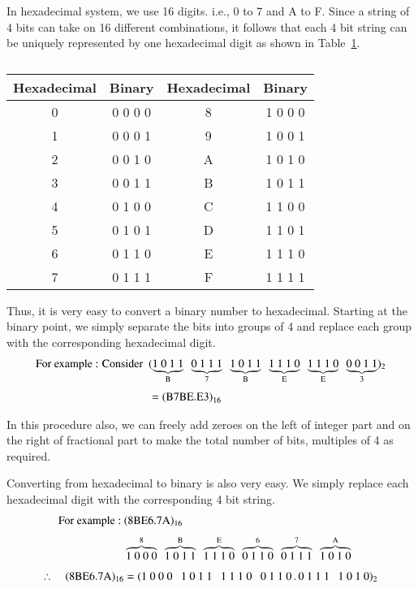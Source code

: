 
In hexadecimal system, we use 16 digits. i.e., 0 to 7 and A to F. Since a string of 4 bits can take on 16 different combinations, it follows that each 4 bit string can be uniquely represented by one hexadecimal digit as shown in Table~\ref{tab5.2}.
\begin{table}[H]
\centering
\caption{}\label{tab5.2}
\renewcommand{\arraystretch}{1.2}
\tabcolsep=10pt
\begin{tabular}{|c|c|c|c|}
\hline
{\bf Hexadecimal} & {\bf Binary} & {\bf Hexadecimal} & {\bf Binary}\\[3pt]
\hline
0 & 0 0 0 0 & 8 & 1 0 0 0\\
1 & 0 0 0 1 & 9 & 1 0 0 1\\
2 & 0 0 1 0 & A & 1 0 1 0\\
3 & 0 0 1 1 & B & 1 0 1 1\\
4 & 0 1 0 0 & C & 1 1 0 0\\
5 & 0 1 0 1 & D & 1 1 0 1\\
6 & 0 1 1 0 & E & 1 1 1 0\\
7 & 0 1 1 1 & F & 1 1 1 1\\
\hline
\end{tabular}
\end{table}

Thus, it is very easy to convert a binary number to hexadecimal. Starting at the binary point, we simply separate the bits into groups of 4 and replace each group with the corresponding hexadecimal digit.
\begin{align*}
\text{For example~: Consider~ } & (\underbrace{1~0~1~1}_{\rmB} \ \ \underbrace{0~1~1~1}_{7} \ \ \underbrace{1~0~1~1}_{\rmB} \ \ \underbrace{1~1~1~0}_{\rmE} \ \ \underbrace{1~1~1~0}_{\rmE} \ \ \underbrace{0~0~1~1}_{3})_{2}\\[3pt]
&= \text{(B7BE.E3)}_{16} 
\end{align*}

In this procedure also, we can freely add zeroes on the left of integer part and on the right of fractional part to make the total number of bits, multiples of 4 as required.

\smallskip
{}

Converting from hexadecimal to binary is also very easy. We simply replace each hexadecimal digit with the corresponding 4 bit string.
\begin{align*}
\text{For example~:~} &(\text{8BE6.7A})_{16}\\[3pt]
& \overbrace{1~0~0~0}^{8} \ \ \overbrace{1~0~1~1}^{\rmB} \ \ \overbrace{1~1~1~0}^{\rmE} \ \ \overbrace{0~1~1~0}^{6} \ \ \overbrace{0~1~1~1}^{7} \ \ \overbrace{1~0~1~0}^{\rmA}\\[3pt]
\therefore\quad (\text{8BE6.7A})_{16} &= (1~0~0~0 \ \ \ 1~0~1~1 \ \ \ 1~1~1~0 \ \ \ 0~1~1~0\,.\,0~1~1~1 \ \ \ 1~0~1~0)_{2}
\end{align*}

